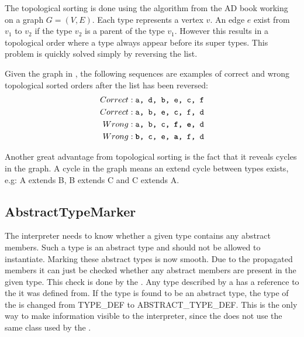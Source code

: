The topological sorting is done using the algorithm from the AD book working on a graph $G = (V, E)$. Each type represents a vertex $v$. An edge $e$ exist from $v_1$ to $v_2$ if the type $v_2$ is a parent of the type $v_1$. However this results in a topological order where a type always appear before its super types. This problem is quickly solved simply by reversing the list.

Given the graph in \label{fig:topological}, the following sequences are examples of correct and wrong topological sorted orders after the list has been reversed:
\begin{align}
 Correct & : \texttt{a, d, b, e, c, f} \\
 Correct & : \texttt{a, b, e, c, f, d} \\
 Wrong & : \texttt{a, b, c, \textbf{f}, \textbf{e}, d} \\
 Wrong & : \texttt{\textbf{b}, c, e, \textbf{a}, f, d}
\end{align}



Another great advantage from topological sorting is the fact that it reveals cycles in the graph. A cycle in the graph means an extend cycle between types exists, e.g: A extends B, B extends C and C extends A.

\subsection{AbstractTypeMarker}
\label{sec:abstractTypeMarker}
The interpreter needs to know whether a given type contains any abstract members. Such a type is an abstract type and should not be allowed to instantiate. Marking these abstract types is now smooth. Due to the propagated members it can just be checked whether any abstract members are present in the given type. This check is done by the . Any type described by a  has a reference to the  it was defined from. If the type is found to be an abstract type, the type of the  is changed from TYPE\_DEF to ABSTRACT\_TYPE\_DEF. This is the only way to make information visible to the interpreter, since the  does not use the same  class used by the .

